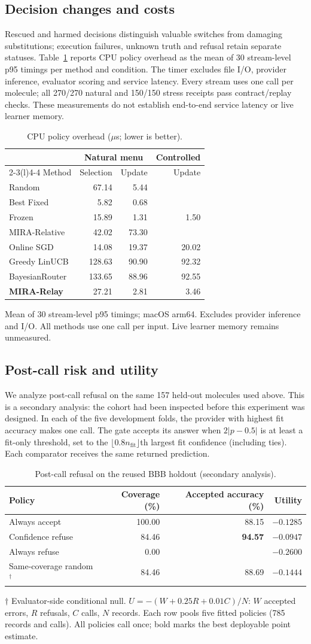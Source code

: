 \documentclass[sigconf,anonymous]{aamas}
\makeatletter
\newcommand{\MiraTableFont}{\fontsize{9}{11}\selectfont}
\newcommand{\tnote}[1]{{\fontsize{8.5}{10}\selectfont\raggedright\par\vspace{3pt}#1\par}}
\newcommand{\notrun}{\textemdash}
\newcommand{\MiraCostCaption}{CPU policy overhead ($\mu$s; lower is better).}
\newcommand{\MiraCostLabels}{\label{tab:cost-validity}}
\newcommand{\MiraCostBody}{%
\begingroup\centering\MiraTableFont\setlength{\tabcolsep}{4pt}\renewcommand{\arraystretch}{1.08}
\begin{tabular}{@{}lrrr@{}}
\toprule
& \multicolumn{2}{c}{Natural menu} & Controlled \\
\cmidrule(lr){2-3}\cmidrule(l){4-4}
Method & Selection & Update & Update \\
\midrule
Random & 67.14 & 5.44 & \notrun \\
Best Fixed & 5.82 & 0.68 & \notrun \\
Frozen & 15.89 & 1.31 & 1.50 \\
MIRA-Relative & 42.02 & 73.30 & \notrun \\
\midrule
Online SGD & 14.08 & 19.37 & 20.02 \\
Greedy LinUCB & 128.63 & 90.90 & 92.32 \\
BayesianRouter & 133.65 & 88.96 & 92.55 \\
\midrule
\textbf{MIRA-Relay} & 27.21 & 2.81 & 3.46 \\
\bottomrule
\end{tabular}\par
\tnote{Mean of 30 stream-level p95 timings; macOS arm64. Excludes provider inference and I/O. All methods use one call per input. Live learner memory remains unmeasured.}
\endgroup}
\makeatother
\begin{document}
\subsection{Decision changes and costs}
Rescued and harmed decisions distinguish valuable switches from damaging substitutions; execution failures, unknown truth and refusal retain separate statuses. Table~\ref{tab:cost-validity} reports CPU policy overhead as the mean of 30 stream-level p95 timings per method and condition. The timer excludes file I/O, provider inference, evaluator scoring and service latency. Every stream uses one call per molecule; all 270/270 natural and 150/150 stress receipts pass contract/replay checks. These measurements do not establish end-to-end service latency or live learner memory.

\begin{table}[t]
\caption{\MiraCostCaption}
\MiraCostLabels
\MiraCostBody
\end{table}

\subsection{Post-call risk and utility}
We analyze post-call refusal on the same 157 held-out molecules used above. This is a secondary analysis: the cohort had been inspected before this experiment was designed. In each of the five development folds, the provider with highest fit accuracy makes one call. The gate accepts its answer when $2|p-0.5|$ is at least a fit-only threshold, set to the $\lfloor0.8n_{\mathrm{fit}}\rfloor$th largest fit confidence (including ties). Each comparator receives the same returned prediction.

\begin{table}[t]
\caption{Post-call refusal on the reused BBB holdout (secondary analysis).}
\label{tab:postcall-verification}\label{tab:postcall}
\begingroup\centering\MiraTableFont\setlength{\tabcolsep}{14pt}\renewcommand{\arraystretch}{1.08}
\begin{tabular}{@{}lrrr@{}}
\toprule
Policy & Coverage (\%) & Accepted accuracy (\%) & Utility \\
\midrule
Always accept & 100.00 & 88.15 & $-0.1285$ \\
Confidence refuse & 84.46 & \textbf{94.57} & $\mathbf{-0.0947}$ \\
Always refuse & 0.00 & \notrun & $-0.2600$ \\
\midrule
Same-coverage random$^{\dagger}$ & 84.46 & 88.69 & $-0.1444$ \\
\bottomrule
\end{tabular}\par
\tnote{$\dagger$ Evaluator-side conditional null. $U=-(W+0.25R+0.01C)/N$: $W$ accepted errors, $R$ refusals, $C$ calls, $N$ records. Each row pools five fitted policies (785 records and calls). All policies call once; bold marks the best deployable point estimate.}
\endgroup
\end{table}
\end{document}
